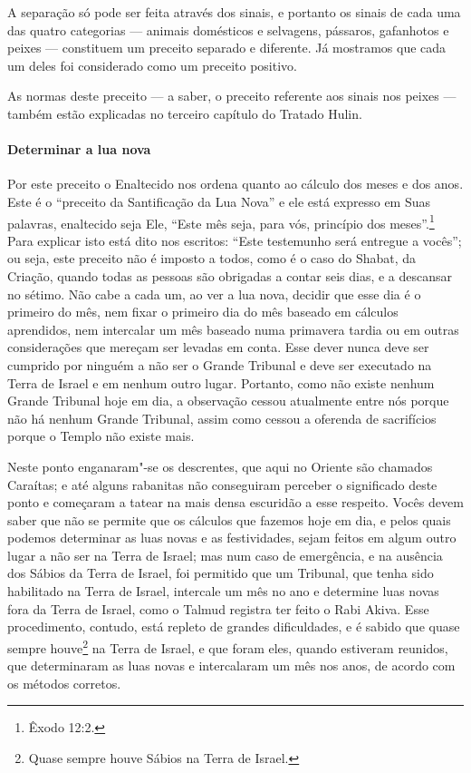 \begin{multicols}{2}
A separação só pode ser feita através dos sinais, e portanto os sinais
de cada uma das quatro categorias --- animais domésticos e selvagens,
pássaros, gafanhotos e peixes --- constituem um preceito separado e
diferente. Já mostramos que cada um deles foi considerado como um
preceito positivo.

As normas deste preceito --- a saber, o preceito referente aos sinais
nos peixes --- também estão explicadas no terceiro capítulo do Tratado
Hulin\starr.

\paragraph{Determinar a lua nova}

Por este preceito o Enaltecido nos ordena quanto ao cálculo dos meses e
dos anos. Este é o ``preceito da Santificação da Lua Nova'' e ele está
expresso em Suas palavras, enaltecido seja Ele, ``Este mês seja, para
vós, princípio dos meses''.\footnote{Êxodo 12:2.} Para explicar isto está dito
nos escritos: ``Este testemunho será entregue a vocês''; ou seja, este preceito não é imposto a
todos, como é o caso do Shabat, da Criação, quando todas as pessoas são
obrigadas a contar seis dias, e a descansar no sétimo. Não cabe a cada
um, ao ver a lua nova, decidir que esse dia é o primeiro do mês, nem
fixar o primeiro dia do mês baseado em cálculos aprendidos, nem
intercalar um mês baseado numa primavera tardia ou em outras
considerações que mereçam ser levadas em conta. Esse dever nunca deve
ser cumprido por ninguém a não ser o Grande Tribunal e deve ser
executado na Terra de Israel e em nenhum outro lugar. Portanto, como
não existe nenhum Grande Tribunal hoje em dia, a observação cessou
atualmente entre nós porque não há nenhum Grande Tribunal, assim como
cessou a oferenda de sacrifícios porque o Templo não existe mais.

Neste ponto enganaram"-se os descrentes, que aqui no Oriente são chamados
Caraítas; e até alguns rabanitas não conseguiram perceber o significado
deste ponto e começaram a tatear na mais densa escuridão a esse
respeito. Vocês devem saber que não se permite que os cálculos que
fazemos hoje em dia, e pelos quais podemos determinar as luas novas e as
festividades, sejam feitos em algum outro lugar a não ser na Terra de
Israel; mas num caso de emergência, e na ausência dos Sábios da Terra
de Israel, foi permitido que um Tribunal, que tenha sido habilitado na Terra de Israel, intercale um mês no ano
e determine luas novas fora da Terra de Israel, como o Talmud\starr{} registra
ter feito o Rabi Akiva\starr. Esse procedimento, contudo, está repleto de grandes
dificuldades, e é sabido que quase sempre houve\footnote{Quase sempre houve Sábios na Terra de Israel.} na Terra de
Israel, e que foram eles, quando estiveram reunidos, que determinaram as luas novas e intercalaram um mês nos anos, de acordo com os métodos corretos.


\end{multicols}
